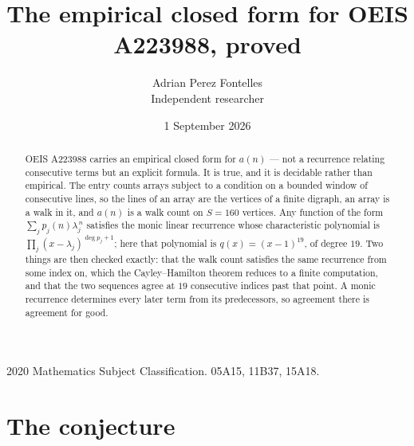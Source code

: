 \documentclass[11pt,a4paper]{article}
\title{The empirical closed form for OEIS A223988, proved}
\author{Adrian Perez Fontelles\\ \small Independent researcher}
\date{1 September 2026}
\theoremstyle{plain}
\theoremstyle{definition}
\begin{document}
\maketitle

\begin{abstract}
OEIS A223988 carries an empirical closed form for $a(n)$ --- not a recurrence relating
consecutive terms but an explicit formula. It is true, and it is decidable rather than
empirical. The entry counts arrays subject to a condition on a bounded window of consecutive lines, so the lines of an array are the
vertices of a finite digraph, an array is a walk in it, and $a(n)$ is a walk count on
$S=160$ vertices. Any function of the form $\sum_j p_j(n)\lambda_j^{\,n}$ satisfies the
monic linear recurrence whose characteristic polynomial is
$\prod_j(x-\lambda_j)^{\deg p_j+1}$; here that polynomial is $q(x)=(x-1)^{19}$, of degree
$19$. Two things are then checked exactly: that the walk count satisfies the same
recurrence from some index on, which the Cayley--Hamilton theorem reduces to a finite
computation, and that the two sequences agree at $19$ consecutive indices past that
point. A monic recurrence determines every later term from its predecessors, so agreement
there is agreement for good.
\end{abstract}

\noindent\small 2020 Mathematics Subject Classification. 05A15, 11B37, 15A18.\normalsize

\section{The conjecture}
\end{document}

